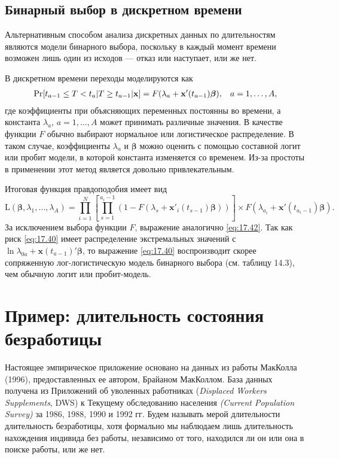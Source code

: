 \subsection{Бинарный выбор в дискретном времени}\label{sec:17.10.3}

\noindent
Альтернативным способом анализа дискретных данных по длительностям являются модели бинарного выбора, поскольку в каждый момент времени возможен лишь один из исходов --- отказ или наступает, или же нет.

В дискретном времени переходы моделируются как
        \begin{align}
        \label{eq:17.45}
        \mathrm{Pr}[t_{a-1}\le T<t_a|T\ge t_{a-1}|\mathbf{x}]=F(\lambda_a+\mathbf{x}'(t_{a-1})\bm{\beta}), \hspace{0.3cm} a=1, \ldots ,A,
        \end{align}
где коэффициенты при объясняющих переменных постоянны во времени, а константа $\lambda_a$, $a=1, \ldots ,A$ может принимать различные значения. В качестве функции $F$ обычно выбирают нормальное или логистическое распределение. В таком случае, коэффициенты $\lambda_a$ и $\bm{\beta}$ можно оценить с помощью составной логит или пробит модели, в которой константа изменяется со временем. Из-за простоты в применении этот метод является довольно привлекательным.

Итоговая функция правдоподобия имеет вид
        $$\mathrm{L}(\bm{\beta},\lambda_1, \ldots ,\lambda_A)=\prod^{N}_{i=1}\left[\prod^{a_i-1}_{s=1}(1-F\left(\lambda_s+\mathbf{x}'_i(t_{s-1})\bm{\beta}\right))\right]\times F\left(\lambda_{a_i}+\mathbf{x}'(t_{a_i-1})\bm{\beta}\right).$$
За исключением выбора функции $F$, выражение аналогично \ref{eq:17.42}. Так как риск \ref{eq:17.40} имеет распределение экстремальных значений с $\ln\lambda_{0a}+\mathbf{x}(t_{a-1})'\bm{\beta}$, то выражение \ref{eq:17.40} воспроизводит скорее сопряженную лог-логистическую модель бинарного выбора %
(см. таблицу 14.3), %
чем обычную логит или пробит-модель.


\section{Пример: длительность состояния безработицы}\label{sec:17.11}

\noindent
Настоящее эмпирическое приложение основано на данных из работы МакКолла (1996), %
предоставленных ее автором, Брайаном МакКоллом. База данных получена из Приложений об уволенных работниках (\textit{Displaced Workers Supplements}, DWS) %
к Текущему обследованию населения \textit{(Current Population Survey)} за 1986, 1988, 1990 и 1992 гг. Будем называть мерой длительности длительность безработицы, хотя формально мы наблюдаем лишь длительность нахождения индивида без работы, независимо от того, находился ли он или она в поиске работы, или же нет.


